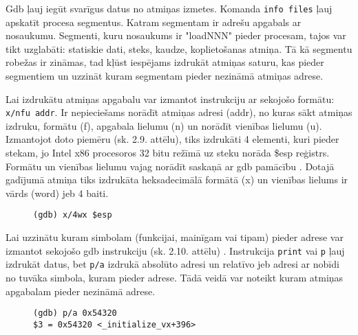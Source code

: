 Gdb ļauj iegūt svarīgus datus no atmiņas izmetes. Komanda \texttt{info files} ļauj apskatīt procesa segmentus. 
Katram segmentam ir adrešu apgabals ar nosaukumu. 
Segmenti, kuru nosaukums ir "loadNNN" pieder procesam, tajos var tikt uzglabāti: statiskie dati, steks, kaudze, koplietošanas atmiņa.
Tā kā segmentu robežas ir zināmas, tad kļūst iespējams izdrukāt atmiņas saturu, kas pieder segmentiem un uzzināt kuram segmentam pieder nezināmā atmiņas adrese.

Lai izdrukātu atmiņas apgabalu var izmantot instrukciju ar sekojošo formātu: \texttt{x/nfu addr}. 
Ir nepieciešams norādīt atmiņas adresi (addr), no kuras sākt atmiņas izdruku, formātu (f), apgabala lielumu (n) un norādīt vienības lielumu (u). 
Izmantojot doto piemēru (sk. 2.9. attēlu), tiks izdrukāti 4 elementi, kuri pieder stekam, jo Intel x86 procesoros 32 bitu režīmā uz steku norāda \$esp reģistrs. 
Formātu un vienības lielumu vajag norādīt saskaņā ar gdb pamācību \cite{gdb}. 
Dotajā gadījumā atmiņa tiks izdrukāta heksadecimālā formātā (x) un vienības lielums ir vārds (word) jeb 4 baiti.
\begin{figure}[h]
\begin{lstlisting}[style=customgdb]
(gdb) x/4wx $esp
\end{lstlisting}
\caption{\textbf{\fontsize{11}{12}\selectfont {Atmiņas apgabala izdrukāšana}}}
\end{figure}

Lai uzzinātu kuram simbolam (funkcijai, mainīgam vai tipam) pieder adrese var izmantot sekojošo gdb instrukciju (sk. 2.10. attēlu) \cite{gdb}.
Instrukcija \texttt{print} vai \texttt{p} ļauj izdrukāt datus, bet \texttt{p/a} izdrukā absolūto adresi un relatīvo jeb adresi ar nobīdi no tuvāka simbola, kuram pieder adrese.
Tādā veidā var noteikt kuram atmiņas apgabalam pieder nezināmā adrese.
\begin{figure}[h]
\begin{lstlisting}[style=customgdb]
(gdb) p/a 0x54320
$3 = 0x54320 <_initialize_vx+396>
\end{lstlisting}
\caption{\textbf{\fontsize{11}{12}\selectfont {Noteikšana, kuram simbolam pieder adrese}}}
\end{figure}

